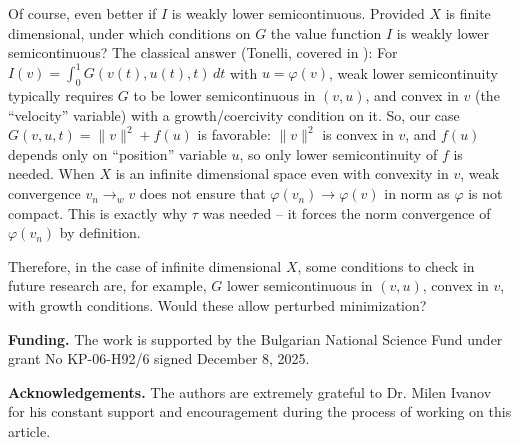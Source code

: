 \documentclass[12pt,leqno]{article}
\theoremstyle{definition}
\theoremstyle{remark}
\begin{document}
    Of course, even better if $I$ is weakly lower semicontinuous. Provided $X$ is finite dimensional, under which conditions on $G$ the value function $I$ is weakly lower semicontinuous? The classical answer (Tonelli, covered in \cite{dacorogna_direct_methods,giusti_direct_methods}): For $I(v) = \int_0^1 G(v(t), u(t), t)\, dt$ with $u = \varphi(v)$, weak lower semicontinuity typically requires $G$ to be lower semicontinuous in $(v, u)$, and  convex in $v$ (the ``velocity'' variable) with a growth/coercivity condition on it. So, our  case $G(v, u, t) = \|v\|^2 + f(u)$ is favorable: $\|v\|^2$ is convex in $v$, and $f(u)$ depends only on ``position'' variable $u$, so only lower semicontinuity of $f$ is needed. When $X$ is an infinite dimensional space  even with convexity in $v$, weak convergence $v_n \to_w v$ does not ensure that $\varphi(v_n) \to \varphi(v)$ in norm as $\varphi$ is not compact. This is exactly why $\tau$ was needed -- it forces the norm convergence of $\varphi(v_n)$ by definition.

    Therefore, in the case of infinite dimensional $X$,  some conditions to check in future research are, for example, $G$ lower semicontinuous in $(v,u)$, convex in $v$, with growth conditions. Would these allow perturbed minimization?
 
 
\bigskip    
    
\textbf{Funding.} The work is supported by the Bulgarian National Science Fund under grant No KP-06-H92/6 signed December 8, 2025.

\bigskip    
    
\textbf{Acknowledgements.}  The authors are extremely grateful to Dr. Milen Ivanov for his constant support and encouragement during the process of working on this article.



\end{document}
